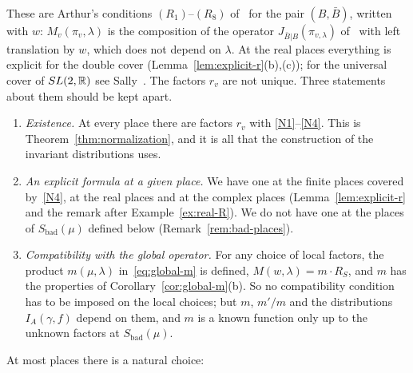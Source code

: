 These are Arthur's conditions $(R_1)$--$(R_8)$ of~\cite[\S2]{Ar89} for the
pair $(B,\bar B)$, written with $w$: $M_v(\pi_v,\lambda)$ is the
composition of the operator $J_{\bar B|B}(\pi_{v,\lambda})$ of~\cite{Ar89}
with left translation by $w$, which does not depend on $\lambda$.
At the real places everything is explicit for the double cover
(Lemma~\ref{lem:explicit-r}(b),(c)); for the universal cover of
$SL(2,\mathbb{R})$ see Sally~\cite{Sa67}. The factors $r_v$ are not
unique. Three statements about them should be kept apart.
\begin{enumerate}[label=(\roman*)]
\item \emph{Existence.} At every place there are factors $r_v$ with
  \ref{N1}--\ref{N4}. This is Theorem~\ref{thm:normalization}, and it is
  all that the construction of the invariant distributions uses.
\item \emph{An explicit formula at a given place.} We have one at the
  finite places covered by~\ref{N4}, at the real places and at the
  complex places (Lemma~\ref{lem:explicit-r} and the remark after
  Example~\ref{ex:real-R}). We do not have one at the places of
  $S_{\mathrm{bad}}(\mu)$ defined below (Remark~\ref{rem:bad-places}).
\item \emph{Compatibility with the global operator.} For any choice of
  local factors, the product $m(\mu,\lambda)$ in~\eqref{eq:global-m} is
  defined, $M(w,\lambda)=m\cdot R_S$, and $m$ has the properties of
  Corollary~\ref{cor:global-m}(b). So no compatibility condition has to be
  imposed on the local choices; but $m$, $m'/m$ and the distributions
  $I_A(\gamma,f)$ depend on them, and $m$ is a known function only up to
  the unknown factors at $S_{\mathrm{bad}}(\mu)$.
\end{enumerate}
At most places there is a natural choice:

